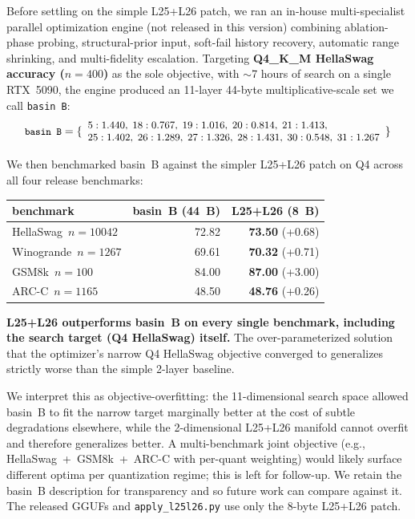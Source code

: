 \documentclass[11pt]{article}
\begin{document}
Before settling on the simple L25+L26 patch, we ran an in-house
multi-specialist parallel optimization engine (not released in this version)
combining ablation-phase probing,
structural-prior input, soft-fail history recovery, automatic range
shrinking, and multi-fidelity escalation. Targeting \textbf{Q4\_K\_M
HellaSwag accuracy ($n{=}400$)} as the sole objective, with $\sim$7 hours
of search on a single RTX~5090, the engine produced an 11-layer 44-byte
multiplicative-scale set we call \texttt{basin~B}:
\begin{equation*}
\small
\texttt{basin~B} = \{
\begin{array}{l}
 5:1.440,\;18:0.767,\;19:1.016,\;20:0.814,\;21:1.413, \\
 25:1.402,\;26:1.289,\;27:1.326,\;28:1.431,\;30:0.548,\;31:1.267
\end{array}
\}
\end{equation*}

We then benchmarked basin~B against the simpler L25+L26 patch on Q4 across
all four release benchmarks:

\begin{center}
\begin{tabular}{lrr}
\toprule
benchmark & basin~B (44~B) & L25+L26 (8~B) \\
\midrule
HellaSwag~$n{=}10042$ & 72.82 & \textbf{73.50} (+0.68) \\
Winogrande~$n{=}1267$ & 69.61 & \textbf{70.32} (+0.71) \\
GSM8k~$n{=}100$       & 84.00 & \textbf{87.00} (+3.00) \\
ARC-C~$n{=}1165$      & 48.50 & \textbf{48.76} (+0.26) \\
\bottomrule
\end{tabular}
\end{center}

\textbf{L25+L26 outperforms basin~B on every single benchmark, including
the search target (Q4 HellaSwag) itself.} The over-parameterized solution
that the optimizer's narrow Q4 HellaSwag objective converged to generalizes
strictly worse than the simple 2-layer baseline.

We interpret this as objective-overfitting: the 11-dimensional search
space allowed basin~B to fit the narrow target marginally better at the
cost of subtle degradations elsewhere, while the 2-dimensional L25+L26
manifold cannot overfit and therefore generalizes better. A multi-benchmark
joint objective (e.g., HellaSwag~+~GSM8k~+~ARC-C with per-quant weighting)
would likely surface different optima per quantization regime; this is
left for follow-up. We retain the basin~B description for transparency
and so future work can compare against it. The released GGUFs and
\texttt{apply\_l25l26.py} use only the 8-byte L25+L26 patch.
\end{document}
